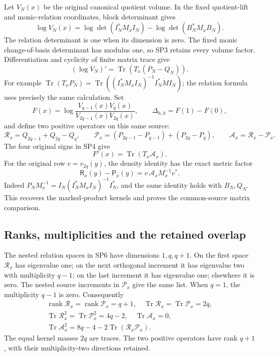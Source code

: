 \documentclass[11pt,a4paper]{article}
\begin{document}
Let \(V_N(x)\) be the original canonical quotient volume. In the
fixed quotient-lift and monic-relation coordinates, block determinant
gives
\[
 \log V_N(x)=\log\det(I_N^*M_xI_N)
                  -\log\det(B_N^*M_xB_N).
 \tag{SP3}
\]
The relation determinant is one when its dimension is zero.
The fixed monic change-of-basis determinant has modulus one, so
SP3 retains every volume factor. Differentiation and cyclicity of
finite matrix trace give
\[
 (\log V_N)'=\operatorname{Tr}(T_x(P_N-Q_N)).
 \tag{SP4}
\]
For example
\(\operatorname{Tr}(T_xP_N)=
\operatorname{Tr}((I_N^*M_xI_N)^{-1}I_N^*\dot M I_N)\);
the relation formula uses precisely the same calculation.
Set
\[
 F(x)=\log\frac{V_{q-1}(x)V_q(x)}
                      {V_{2q-1}(x)V_{2q}(x)},\qquad
 \Delta_{h,k}=F(1)-F(0),
 \tag{SP5}
\]
and define two positive operators on this same source:
\[
 \mathcal R_x=Q_{2q-1}+Q_{2q}-Q_q,\qquad
 \mathcal P_x=(P_{2q-1}-P_{q-1})+(P_{2q}-P_q),\qquad
 \mathcal A_x=\mathcal R_x-\mathcal P_x .
 \tag{SP6}
\]
The four original signs in SP4 give
\[
                  F'(x)=\operatorname{Tr}(T_x\mathcal A_x).
 \tag{SP7}
\]
For the original row \(v=v_{2q}(y)\), the density identity has the exact
metric factor
\[
 \mathsf R_x(y)-\mathsf P_x(y)=v\,\mathcal A_xM_x^{-1}v^* .
\]
Indeed \(P_NM_x^{-1}=I_N(I_N^*M_xI_N)^{-1}I_N^*\),
and the same identity holds with \(B_N,Q_N\). This recovers the
marked-product kernels and proves the common-source matrix comparison.

\subsection{Ranks, multiplicities and the retained overlap}
The nested relation spaces in SP6 have dimensions \(1,q,q+1\).
On the first space \(\mathcal R_x\) has eigenvalue one; on the next
orthogonal increment it has eigenvalue two with multiplicity \(q-1\);
on the last increment it has eigenvalue one; elsewhere it is zero.
The nested source increments in \(\mathcal P_x\) give the same list.
When \(q=1\), the multiplicity \(q-1\) is zero. Consequently
\[
 \begin{gathered}
 \operatorname{rank}\mathcal R_x=\operatorname{rank}\mathcal P_x=q+1,
 \quad
 \operatorname{Tr}\mathcal R_x=\operatorname{Tr}\mathcal P_x=2q,\\
 \operatorname{Tr}\mathcal R_x^2
       =\operatorname{Tr}\mathcal P_x^2=4q-2,\quad
 \operatorname{Tr}\mathcal A_x=0,\\
 \operatorname{Tr}\mathcal A_x^2
       =8q-4-2\operatorname{Tr}(\mathcal R_x\mathcal P_x).
 \end{gathered}
 \tag{SP8}
\]
The equal kernel masses \(2q\) are traces. The two positive operators
have rank \(q+1\), with their multiplicity-two directions retained.
\end{document}
